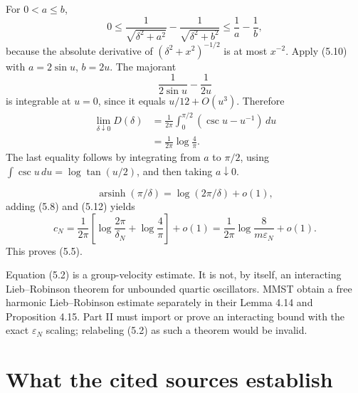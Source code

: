 \documentclass[11pt,a4paper]{article}
\newcommand{\eps}{\varepsilon}
\newcommand{\dd}{\,d}
\begin{document}
For $0<a\leq b$,
\[
 0\leq\frac1{\sqrt{\delta^2+a^2}}
       -\frac1{\sqrt{\delta^2+b^2}}
 \leq\frac1a-\frac1b,                                         \tag{5.10}
\]
because the absolute derivative of $(\delta^2+x^2)^{-1/2}$ is at most $x^{-2}$.
Apply (5.10) with $a=2\sin u$, $b=2u$.  The majorant
\[
 \frac1{2\sin u}-\frac1{2u}                                    \tag{5.11}
\]
is integrable at $u=0$, since it equals $u/12+O(u^3)$.  Therefore
\begin{align}
 \lim_{\delta\downarrow0}D(\delta)
 &=\frac1{2\pi}\int_0^{\pi/2}(\csc u-u^{-1})\dd u\\
 &=\frac1{2\pi}\log\frac4\pi.                                \tag{5.12}
\end{align}
The last equality follows by integrating from $a$ to $\pi/2$, using
$\int\csc u\dd u=\log\tan(u/2)$, and then taking $a\downarrow0$.

\[
 \operatorname{arsinh}(\pi/\delta)=\log(2\pi/\delta)+o(1),      \tag{5.13}
\]
adding (5.8) and (5.12) yields
\[
 c_N=\frac1{2\pi}\left[
 \log\frac{2\pi}{\delta_N}+\log\frac4\pi\right]+o(1)
 =\frac1{2\pi}\log\frac8{m\eps_N}+o(1).
\]
This proves (5.5). \QedStep

\begin{remark}
Equation (5.2) is a group-velocity estimate.  It is not, by itself, an interacting
Lieb--Robinson theorem for unbounded quartic oscillators.  MMST obtain a free harmonic
Lieb--Robinson estimate separately in their Lemma 4.14 and Proposition 4.15.  Part II
must import or prove an interacting bound with the exact $\eps_N$ scaling; relabeling
(5.2) as such a theorem would be invalid.
\end{remark}

\section{What the cited sources establish}\label{sec:sources}
\end{document}
